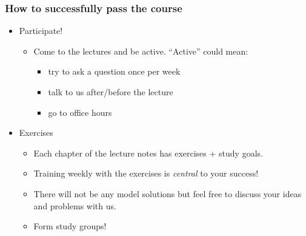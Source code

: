 \documentclass[aspectratio=169, 12pt, final, professionalfont]{beamer}
\begin{document}
\begin{frame}\frametitle{How to successfully pass the course}
  \begin{itemize}
    \item Participate!
    \begin{itemize}
      \item Come to the lectures and be active. ``Active'' could mean:
      \begin{itemize}
        \item try to ask a question once per week
        \item talk to us after/before the lecture
        \item go to office hours
      \end{itemize}
    \end{itemize}
    \item Exercises
    \begin{itemize}
      \item Each chapter of the lecture notes has exercises  + study goals.
      \item Training weekly with the exercises is \emph{central} to your success!
      \item There will not be any model solutions but feel free to discuss your ideas and problems with us.
      \item Form study groups!
    \end{itemize}
  \end{itemize}
\end{frame}
\end{document}
